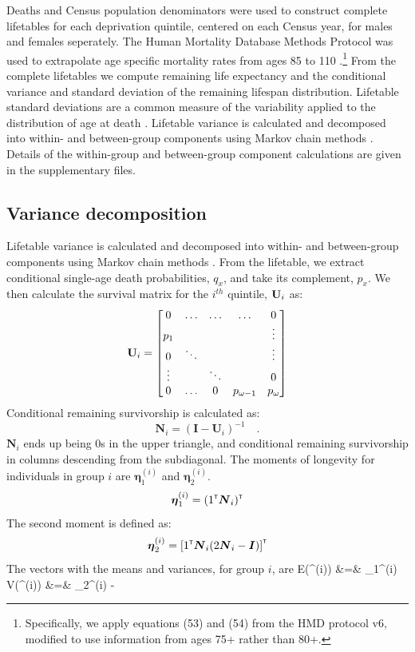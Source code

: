 \documentclass[12pt,oneside,a4paper]{article} %
\theoremstyle{definition}
\begin{document}
Deaths and Census population denominators were used to construct complete
lifetables for each deprivation quintile, centered on each Census year, for
males and females seperately. The Human Mortality Database
Methods Protocol was used to extrapolate age specific mortality rates from
ages 85 to 110 \citep{Wilmoth2017}.\footnote{Specifically, we apply equations (53) and
(54) from the HMD protocol v6, modified to use information from ages 75+
rather than 80+.} From the complete lifetables we compute remaining
life expectancy and the conditional variance and standard deviation of
the remaining lifespan distribution. Lifetable standard deviations are a common
measure of the variability applied to the distribution of age at death \citep{Raalte2013}. Lifetable variance is calculated and decomposed into within- and between-group components using Markov chain methods \citep{Caswell2001}\citep{Caswell2009}\citep{Caswell2014}. Details of the within-group and between-group component calculations are given in the supplementary files.


\subsection{Variance decomposition}
Lifetable variance is calculated and decomposed into within- and between-group
components using Markov chain methods \citep{Caswell2001}\citep{Caswell2009}\citep{Caswell2014}. From the lifetable, we extract
conditional single-age death probabilities, $q_x$, and take its complement,
$p_x$. We then calculate the survival matrix for the $i^{th}$
quintile, ${\bf U}_i$ as:
\begin{equation}
{\bf U}_i = 
\begin{bmatrix}
    0     & \hdots  & \hdots &  \hdots  & 0 \\
    p_{1} &   &    &    &  \vdots \\
    0 & \ddots &   &   & \vdots \\
    \vdots & & \ddots & & 0\\
   0 &  \hdots & 0 & p_{\omega-1}  & p_{\omega}
\end{bmatrix}
\end{equation}
Conditional remaining survivorship is calculated as:
\begin{equation}
\mathbf{N}_i = (\mathbf{I} - \mathbf{U}_i )^{-1} \quad .
\end{equation}
$\mathbf{N}_i$ ends up being 0s in the upper triangle, and conditional remaining
survivorship in columns descending from the subdiagonal. The moments of longevity for individuals in group $i$ are $\bm \eta_1^{(i)}$ and $\bm \eta_2^{(i)}$. 
\begin{equation}
\mbox{\boldmath $\eta$}_1^{(i)} = (1^{\mbox{\tiny \sf T}} \mbox{\boldmath $N$}_i)^{\mbox{\tiny \sf T}}
\end{equation}
The second moment is defined as:
\begin{equation}
\mbox{\boldmath $\eta$}_2^{(i)} = \left[ 1^{\mbox{\tiny \sf T}} \mbox{\boldmath $N$}_i (2 \mbox{\boldmath $N$}_i - \mbox{\boldmath $I$})\right]^{\mbox{\tiny \sf T}}
\end{equation}
The vectors with the means and variances, for group $i$, are
\bea
E(\bm \eta^{(i)}) &=& \bm \eta_1^{(i)} \\
V(\bm \eta^{(i)}) &=& \bm \eta_2^{(i)} - 
\eea
\end{document}

